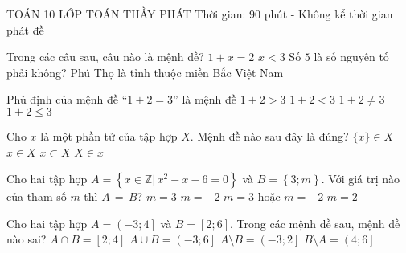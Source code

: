 \begin{name}
	{\tenchude}
	{TOÁN 10}
	{LỚP TOÁN THẦY PHÁT}
	{Thời gian: 90 phút - Không kể thời gian phát đề}
\end{name}
\begin{ex}
	Trong các câu sau, câu nào là mệnh đề?
	\choice
	{$1+x=2$}
	{$x<3$}
	{Số $5$ là số nguyên tố phải không?}
	{\True Phú Thọ là tỉnh thuộc miền Bắc Việt Nam}
\end{ex}
\begin{ex}
	Phủ định của mệnh đề “$1+2=3$” là mệnh đề
	\choice
	{$1+2>3$}
	{$1+2<3$}
	{\True $1+2\ne 3$}
	{$1+2\le 3$}
\end{ex}
\begin{ex}
	Cho $x$ là một phần tử của tập hợp $X$. Mệnh đề nào sau đây là đúng?
	\choice
	{$\{x\}\in X$}
	{\True $x\in X$}
	{$x\subset X$}
	{$X\in x$}
\end{ex}
\begin{ex}
	Cho hai tập hợp $A=\left\{ x\in \mathbb{Z}|\,x^2-x-6=0 \right\}$ và $B=\left\{ 3;m \right\}$. Với giá trị nào của tham số $m$ thì $A\,=\,B$?
	\choice
	{$m=3$}
	{\True $m=-2$}
	{$m=3$ hoặc $m=-2$}
    {$m=2$}
\end{ex}
\begin{ex}
	Cho hai tập hợp $A=\left(-3;4\right]$ và $B=\left[2;6\right]$. Trong các mệnh đề sau, mệnh đề nào sai?
	\choice
	{$A\cap B=\left[2;4\right]$}
    {$A\cup B=\left(-3;6\right]$}
	{\True $A\setminus B=\left(-3;2\right]$}
	{$B\setminus A=\left(4;6\right]$}
	\loigiai{
		Ta có: $A\cap B=\left[2;4\right]$; $A\cup B=\left(-3;6\right]$; $A\setminus B=\left(-3;2\right)$ và $B\setminus A=\left(4;6\right]$.
	}
\end{ex}
